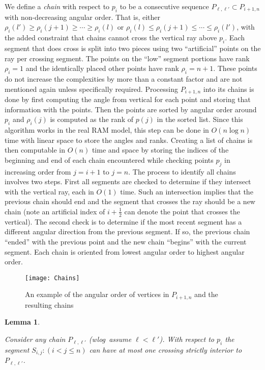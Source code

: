 \documentclass{article}
\newtheorem{lemma}[theorem]{Lemma}
\begin{document}
We define a \emph{chain} with respect to $p_i$ to be a consecutive sequence
$P_{\ell,\ell '}\subset P_{i+1,n}$ with non-decreasing angular order.  That
is, either $\rho_i(l')\ge \rho_i(j+1) \ge \cdots \ge \rho_i(l)$ or
$\rho_i(l)\le \rho_i(j+1) \le \cdots \le \rho_i(l')$, with the added
constraint that chains cannot cross the vertical ray above $p_i$.  Each
segment that does cross is split into two pieces using two ``artificial''
points on the ray per crossing segment.  The points on the ``low'' segment
portions have rank $\rho_i=1$ and the identically placed other points have
rank $\rho_i=n+1$.  These points do not increase the complexities by more
than a constant factor and are not mentioned again unless specifically
required.  Processing $P_{i+1,n}$ into its chains is done by first computing
the angle from vertical for each point and storing that information with the
points.  Then the points are sorted by angular order around $p_i$ and
$\rho_i(j)$ is computed as the rank of $p(j)$ in the sorted list.  Since
this algorithm works in the real RAM model, this step can be done in
$O(n\log n)$ time with linear space to store the angles and ranks.  Creating
a list of chains is then computable in $O(n)$ time and space by storing the indices of the
beginning and end of each chain encountered while checking points $p_j$ in
increasing order from $j=i+1$ to $j=n$.  The process to identify all chains involves two steps.
First all
segments are checked to determine if they intersect with the vertical ray,
each in $O(1)$ time.  Such an intersection implies that the previous chain
should end and the segment that crosses the ray should be a new chain (note an artificial index of $i+\frac{1}{2}$ can denote the point that crosses the vertical).  The
second check is to determine if the most recent segment has a different
angular direction from the previous segment.  If so, the previous chain ``ended''
with the previous point and the new chain ``begins'' with the current segment. 
Each chain is oriented from lowest angular order to highest angular
order.

\begin{figure}
\texttt{[image: Chains]}
\caption{An example of the angular order of vertices in $P_{i+1,n}$ and the
  resulting chains}
\label{fig:angularchains}
\end{figure}
	
\begin{lemma}\label{lem:segmentcross}
	
Consider any chain $P_{\ell,\ell'}$ (wlog\ assume $\ell<\ell'$). With respect
to $p_i$ the segment $S_{i,j}: (i<j\leq n)$ can have at most one crossing
strictly interior to $P_{\ell,\ell'}$.
	
\end{lemma}
\end{document}
